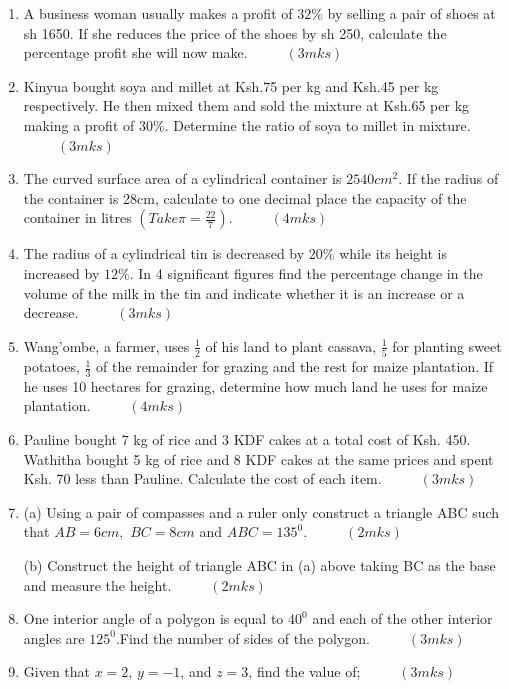 \documentclass[
  a4paperpaper,
]{scrbook}
\begin{document}
\begin{tcolorbox}
\begin{enumerate}
\def\labelenumi{\arabic{enumi}.}
\setcounter{enumi}{4}
\item
  A business woman usually makes a profit of \(32\%\) by selling a pair
  of shoes at sh 1650. If she reduces the price of the shoes by sh 250,
  calculate the percentage profit she will now make.
  \(\hspace{1cm} (3mks)\)
\item
  Kinyua bought soya and millet at Ksh.75 per kg and Ksh.45 per kg
  respectively. He then mixed them and sold the mixture at Ksh.65 per kg
  making a profit of \(30\%\). Determine the ratio of soya to millet in
  mixture. \(\hspace{1cm} (3mks)\)
\item
  The curved surface area of a cylindrical container is \(2540cm^2\). If
  the radius of the container is 28cm, calculate to one decimal place
  the capacity of the container in litres \((Take \pi=\frac{22}{7} )\).
  \(\hspace{1cm}(4mks)\)
\item
  The radius of a cylindrical tin is decreased by \(20\%\) while its
  height is increased by \(12\%\). In 4 significant figures find the
  percentage change in the volume of the milk in the tin and indicate
  whether it is an increase or a decrease. \(\hspace{1cm} (3mks)\)
\item
  Wang'ombe, a farmer, uses \(\frac{1}{2}\) of his land to plant
  cassava, \(\frac{1}{5}\) for planting sweet potatoes, \(\frac{1}{3}\)
  of the remainder for grazing and the rest for maize plantation. If he
  uses 10 hectares for grazing, determine how much land he uses for
  maize plantation. \(\hspace{1cm} (4mks)\)
\item
  Pauline bought 7 kg of rice and 3 KDF cakes at a total cost of Ksh.
  450. Wathitha bought 5 kg of rice and 8 KDF cakes at the same prices
  and spent Ksh. 70 less than Pauline. Calculate the cost of each item.
  \(\hspace{1cm} (3mks)\)
\item
  (a) Using a pair of compasses and a ruler only construct a triangle
  ABC such that \(AB = 6cm,\) \(BC = 8cm\) and \(ABC = 135^0\).
  \(\hspace{1cm} (2mks)\)

  (b) Construct the height of triangle ABC in (a) above taking BC as the
  base and measure the height. \(\hspace{1cm} (2mks)\)
\item
  One interior angle of a polygon is equal to \(40^0\) and each of the
  other interior angles are \(125^0\).Find the number of sides of the
  polygon. \(\hspace{1cm} (3mks)\)
\item
  Given that \(x=2\), \(y=-1\), and \(z=3\), find the value of;
  \(\hspace{1cm} (3mks)\)
\end{enumerate}


\end{tcolorbox}
\end{document}

